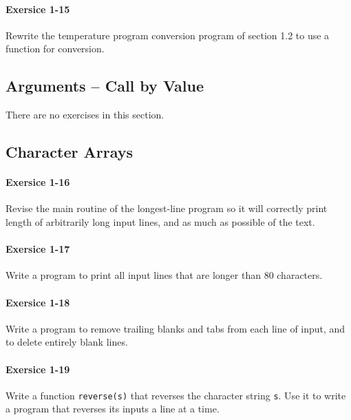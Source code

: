 		\paragraph{Exersice 1-15}
			Rewrite the temperature program conversion program of section 1.2 to
			use a function for conversion.
	
			\hfill{}\cite[p.~27]{knr}

	\newpage
	\subsection{Arguments -- Call by Value}
	There are no exercises in this section.
	
	\newpage
	\subsection{Character Arrays}
		\paragraph{Exersice 1-16}
			Revise the main routine of the longest-line program so it will
			correctly print length of arbitrarily long input lines, and as
			much as possible of the text.
	
			\hfill{}\cite[p.~30]{knr}

		\paragraph{Exersice 1-17}
			Write a program to print all input lines that are longer than 80
			characters.
	
			\hfill{}\cite[p.~31]{knr}

		\paragraph{Exersice 1-18}
			Write a program to remove trailing blanks and tabs from each line
			of input, and to delete entirely blank lines.

			\hfill{}\cite[p.~31]{knr}

		\paragraph{Exersice 1-19}
			Write a function \lstinline{reverse(s)} that reverses the
			character string \lstinline{s}. Use it to write a program that
			reverses its inputs a line at a time.
	
			\hfill{}\cite[p.~31]{knr}


